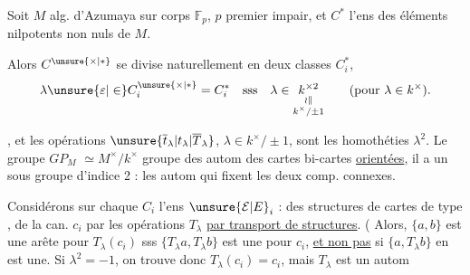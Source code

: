 Soit $M$ alg. d'Azumaya sur corps $\mathbb F_p$, $p$ premier impair, et $C^*$ l'ens des éléments nilpotents non nuls de $M$.

Alors  $C^{\unsure{\times|*}}$ se divise naturellement en deux classes $C_i^*$, 
\[
\lambda\unsure{\varepsilon|\in} C_i^{\unsure{\times|*}}=C_i^*\quad\mathrm{sss}\quad\lambda\in\underset{\substack{\wr\Vert\\ k^\times/\pm1}}{k^{\times2}}\qquad(\text{pour }\lambda\in k^\times).
\]

 , et les opérations $\unsure{\overline t_\lambda|t_\lambda|\overline T_\lambda}$, $\lambda\in k^\times/\pm1$, sont les homothéties $\lambda^2$. Le groupe $G\!P_M$ $\simeq M^\times/k^\times$   groupe des autom des cartes bi-cartes \uline{orientées}, il a un sous groupe d'indice 2 : les autom qui fixent les deux comp. connexes. 

Considérons sur chaque $C_i$ l'ens $\unsure{\mathcal E|E}_i$ :  des structures de cartes de type ,  de la can. $c_i$ par les opérations $T_\lambda$ \uline{par transport de structures}.  ( Alors, $\{a,b\}$ est une arête pour $T_\lambda(c_i)$ sss  $\{T_\lambda a,T_\lambda b\}$  est une pour $c_i$, \uline{et non pas} si $\{a,T_\lambda b\}$ en est une.  Si $\lambda^2=-1$, on trouve donc $T_\lambda(c_i)=c_i$, mais $T_\lambda$ est un autom
